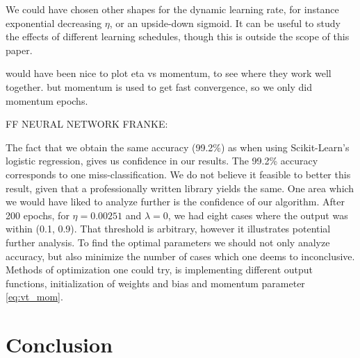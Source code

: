 \documentclass[12pt]{extarticle}
\begin{document}
We could have chosen other shapes for the dynamic learning rate, for instance exponential decreasing $\eta$, or an upside-down sigmoid. It can be useful to study the effects of different learning schedules, though this is outside the scope of this paper.

would have been nice to plot eta vs momentum, to see where they work well together. but momentum is used to get fast convergence, so we only did momentum epochs.

FF NEURAL NETWORK FRANKE:




The fact that we obtain the same accuracy (99.2\%) as when using Scikit-Learn's logistic regression, gives us confidence in our results. The 99.2\% accuracy corresponds to one miss-classification. We do not believe it feasible to better this result, given that a professionally written library yields the same. One area which we would have liked to analyze further is the confidence of our algorithm. After 200 epochs, for $\eta = 0.00251$ and $\lambda = 0$, we had eight cases where the output was within (0.1, 0.9). That threshold is arbitrary, however it illustrates potential further analysis. To find the optimal parameters we should not only analyze accuracy, but also minimize the number of cases which one deems to inconclusive. Methods of optimization one could try, is implementing different output functions, initialization of weights and bias and momentum parameter \eqref{eq:vt_mom}.

\section{Conclusion}




\end{document}
